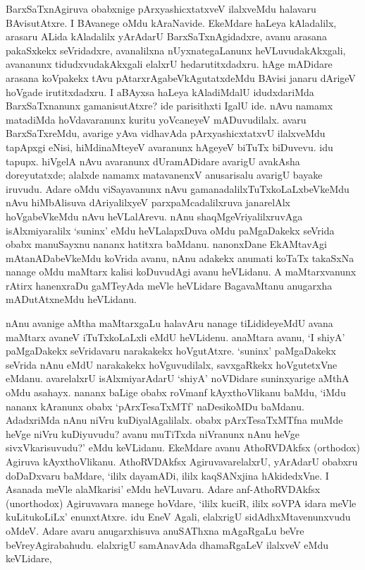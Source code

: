 BarxSaTxnAgiruva obabxnige pArxyashicxtatxveV ilalxveMdu halavaru BAvisutAtxre. I BAvanege oMdu kAraNavide. EkeMdare haLeya kAladalilx, arasaru ALida kAladalilx yArAdarU BarxSaTxnAgidadxre, avanu arasana pakaSxkekx seVridadxre, avanalilxna nUyxnategaLanunx heVLuvudakAkxgali, avananunx tidudxvudakAkxgali elalxrU hedarutitxdadxru. hAge mADidare arasana koVpakekx tAvu pAtarxrAgabeVkAgutatxdeMdu BAvisi janaru dArigeV hoVgade irutitxdadxru. I aBAyxsa haLeya kAladiMdalU idudxdariMda BarxSaTxnanunx gamanisutAtxre? ide parisithxti IgalU ide. nAvu namamx 
matadiMda hoVdavaranunx kuritu yoVcaneyeV mADuvudilalx. avaru BarxSaTxreMdu, avarige yAva vidhavAda pArxyashicxtatxvU ilalxveMdu tapApxgi eNisi, hiMdinaMteyeV avaranunx hAgeyeV biTuTx biDuvevu. idu tapupx. hiVgelA nAvu avaranunx dUramADidare avarigU avakAsha doreyutatxde; alalxde namamx matavanenxV anusarisalu avarigU bayake iruvudu. Adare oMdu viSayavanunx nAvu gamanadalilxTuTxkoLaLxbeVkeMdu nAvu hiMbAlisuva dAriyalilxyeV parxpaMcadalilxruva janarelAlx hoVgabeVkeMdu nAvu heVLalArevu. nAnu shaqMgeVriyalilxruvAga isAlxmiyaralilx `suninx' eMdu heVLalapxDuva oMdu paMgaDakekx seVrida obabx manuSayxnu nananx hatitxra baMdanu. nanonxDane EkAMtavAgi mAtanADabeVkeMdu koVrida avanu, nAnu adakekx anumati koTaTx takaSxNa nanage oMdu maMtarx kalisi koDuvudAgi avanu heVLidanu. A maMtarxvanunx rAtirx hanenxraDu gaMTeyAda meVle heVLidare BagavaMtanu anugarxha mADutAtxneMdu heVLidanu.

nAnu avanige aMtha maMtarxgaLu halavAru nanage tiLidideyeMdU avana maMtarx avaneV iTuTxkoLaLxli eMdU heVLidenu. anaMtara avanu, `I shiyA' paMgaDakekx seVridavaru narakakekx hoVgutAtxre. `suninx' paMgaDakekx seVrida nAnu eMdU narakakekx hoVguvudilalx, savxgaRkekx hoVgutetxVne eMdanu. avarelalxrU isAlxmiyarAdarU `shiyA' noVDidare suninxyarige 
aMthA oMdu asahayx. nananx baLige obabx roVmanf kAyxthoVlikanu baMdu, `iMdu nananx kAranunx obabx `pArxTesaTxMTf' naDesikoMDu baMdanu. AdadxriMda nAnu niVru kuDiyalAgalilalx. obabx pArxTesaTxMTfna muMde heVge niVru kuDiyuvudu? avanu muTiTxda niVranunx nAnu heVge sivxVkarisuvudu?' eMdu keVLidanu. EkeMdare avanu AthoRVDAkfsx {(\rm orthodox)} Agiruva kAyxthoVlikanu. AthoRVDAkfsx AgiruvavarelalxrU, yArAdarU obabxru doDaDxvaru baMdare, `ililx dayamADi, ililx kaqSANxjina hAkidedxVne. I Asanada meVle alaMkarisi' eMdu heVLuvaru. Adare anf-AthoRVDAkfsx {(\rm unorthodox)} Agiruvavara manege hoVdare, `ililx kuciR, ililx soVPA idara meVle kuLitukoLiLx' enunxtAtxre. idu EneV Agali, elalxrigU sidAdhxMtavenunxvudu oMdeV. Adare avaru anugarxhisuva anuSAThxna mAgaRgaLu beVre beVreyAgirabahudu. elalxrigU samAnavAda dhamaRgaLeV ilalxveV eMdu keVLidare,

